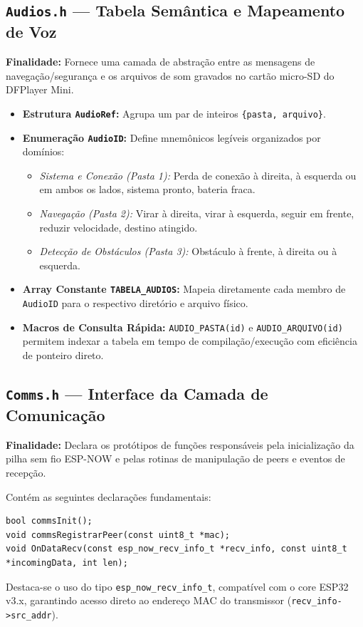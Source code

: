 \documentclass[12pt,a4paper]{article}
\begin{document}
\subsection{\texttt{Audios.h} --- Tabela Semântica e Mapeamento de Voz}
\textbf{Finalidade:} Fornece uma camada de abstração entre as mensagens de navegação/segurança e os arquivos de som gravados no cartão micro-SD do DFPlayer Mini.

\begin{itemize}
    \item \textbf{Estrutura \texttt{AudioRef}:} Agrupa um par de inteiros \texttt{\{pasta, arquivo\}}.
    \item \textbf{Enumeração \texttt{AudioID}:} Define mnemônicos legíveis organizados por domínios:
    \begin{itemize}
        \item \textit{Sistema e Conexão (Pasta 1):} Perda de conexão à direita, à esquerda ou em ambos os lados, sistema pronto, bateria fraca.
        \item \textit{Navegação (Pasta 2):} Virar à direita, virar à esquerda, seguir em frente, reduzir velocidade, destino atingido.
        \item \textit{Detecção de Obstáculos (Pasta 3):} Obstáculo à frente, à direita ou à esquerda.
    \end{itemize}
    \item \textbf{Array Constante \texttt{TABELA\_AUDIOS}:} Mapeia diretamente cada membro de \texttt{AudioID} para o respectivo diretório e arquivo físico.
    \item \textbf{Macros de Consulta Rápida:} \texttt{AUDIO\_PASTA(id)} e \texttt{AUDIO\_ARQUIVO(id)} permitem indexar a tabela em tempo de compilação/execução com eficiência de ponteiro direto.
\end{itemize}

\subsection{\texttt{Comms.h} --- Interface da Camada de Comunicação}
\textbf{Finalidade:} Declara os protótipos de funções responsáveis pela inicialização da pilha sem fio ESP-NOW e pelas rotinas de manipulação de peers e eventos de recepção.

Contém as seguintes declarações fundamentais:
\begin{lstlisting}
bool commsInit();
void commsRegistrarPeer(const uint8_t *mac);
void OnDataRecv(const esp_now_recv_info_t *recv_info, const uint8_t *incomingData, int len);
\end{lstlisting}
Destaca-se o uso do tipo \lstinline|esp_now_recv_info_t|, compatível com o core ESP32 v3.x, garantindo acesso direto ao endereço MAC do transmissor (\lstinline|recv_info->src_addr|).
\end{document}
